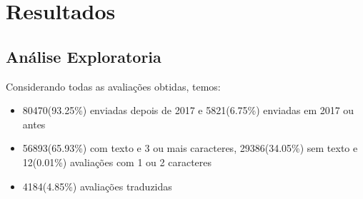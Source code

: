 \chapter{Resultados}
\label{cap:resultados}


\section{Análise Exploratoria}
\label{cap:resultados:sec:analise_exploratoria}

Considerando todas as avaliações obtidas, temos:

\begin{itemize}
  \item 80470(93.25\%) enviadas depois de 2017 e 5821(6.75\%) enviadas em 2017 ou antes
  \item 56893(65.93\%) com texto e 3 ou mais caracteres, 29386(34.05\%) sem texto e 12(0.01\%) avaliações com 1 ou 2 caracteres
  \item 4184(4.85\%) avaliações traduzidas
\end{itemize}









